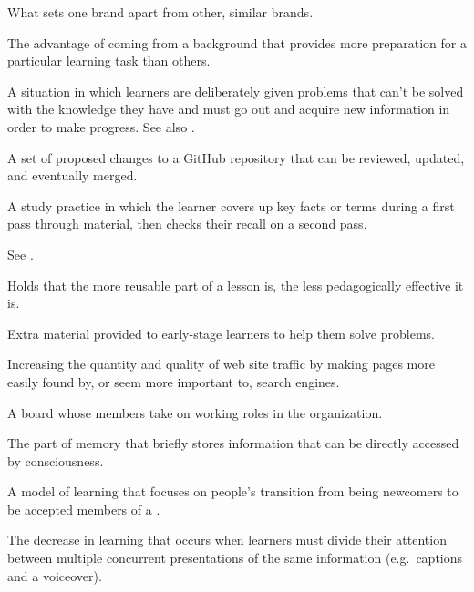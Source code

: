 \begin{description}
 What sets one brand apart from other,
similar brands.

 The advantage of coming
from a background that provides more preparation for a particular learning task
than others.

 A situation in which learners
are deliberately given problems that can't be solved with the knowledge they
have and must go out and acquire new information in order to make progress.
See also .

 A set of proposed changes to a GitHub
repository that can be reviewed, updated, and eventually merged.

 A study practice in which
the learner covers up key facts or terms during a first pass through material,
then checks their recall on a second pass.

See .

 Holds that the more reusable
part of a lesson is, the less pedagogically effective it is.

 Extra material provided to early-stage
learners to help them solve problems.

 Increasing the quantity and quality
of web site traffic by making pages more easily found by, or seem more important
to, search engines.

 A board whose members take on working roles
in the organization.

 The part of memory that briefly
stores information that can be directly accessed by consciousness.

 A model of learning that focuses
on people's transition from being newcomers to be accepted members of a
.

 The decrease in
learning that occurs when learners must divide their attention between multiple
concurrent presentations of the same information (e.g.\ captions and a
voiceover).


\end{description}
